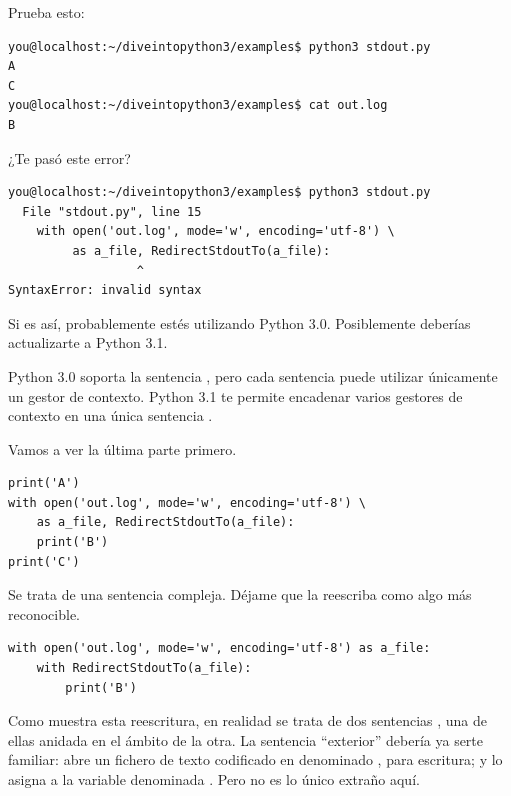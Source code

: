 Prueba esto:

\noindent\begin{minipage}{\textwidth}
\begin{lstlisting}[mathescape=False]
you@localhost:~/diveintopython3/examples$ python3 stdout.py
A
C
you@localhost:~/diveintopython3/examples$ cat out.log
B
\end{lstlisting}
\end{minipage}

¿Te pasó este error?

\noindent\begin{minipage}{\textwidth}
\begin{lstlisting}[mathescape=False]
you@localhost:~/diveintopython3/examples$ python3 stdout.py
  File "stdout.py", line 15
    with open('out.log', mode='w', encoding='utf-8') \
         as a_file, RedirectStdoutTo(a_file):
                  ^
SyntaxError: invalid syntax
\end{lstlisting}
\end{minipage}

Si es así, probablemente estés utilizando Python 3.0. Posiblemente deberías actualizarte a Python 3.1.

Python 3.0 soporta la sentencia , pero cada sentencia puede utilizar únicamente un gestor de contexto. Python 3.1 te permite encadenar varios gestores de contexto en una única sentencia .

Vamos a ver la última parte primero.

\noindent\begin{minipage}{\textwidth}
\begin{lstlisting}[mathescape=True]
print('A')
with open('out.log', mode='w', encoding='utf-8') \
    as a_file, RedirectStdoutTo(a_file):
    print('B')
print('C')
\end{lstlisting}
\end{minipage}

Se trata de una sentencia  compleja. Déjame que la reescriba como algo más reconocible.

\noindent\begin{minipage}{\textwidth}
\begin{lstlisting}[mathescape=True]
with open('out.log', mode='w', encoding='utf-8') as a_file:
    with RedirectStdoutTo(a_file):
        print('B')
\end{lstlisting}
\end{minipage}

Como muestra esta reescritura, en realidad se trata de dos sentencias , una de ellas anidada en el ámbito de la otra. La sentencia  ``exterior'' debería ya serte familiar: abre un fichero de texto codificado en  denominado , para escritura; y lo asigna a la variable denominada . Pero no es lo único extraño aquí.

